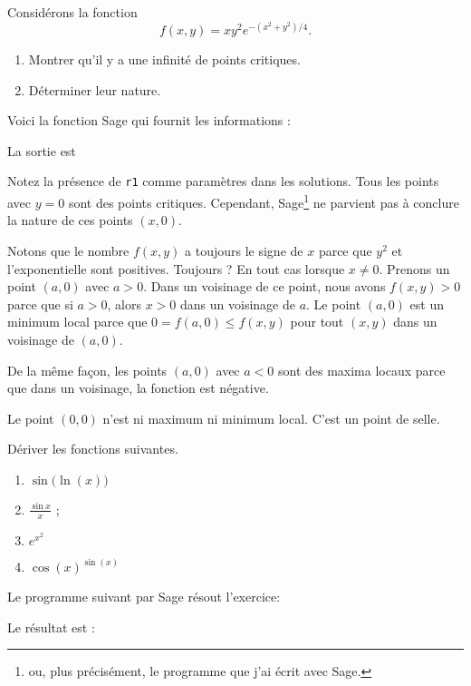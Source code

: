 \begin{example}     \label{exEEHPooKDxLTJ}
    

	Considérons la fonction
	\begin{equation}
		f(x,y)=xy^2 e^{-(x^2+y^2)/4}.
	\end{equation}
	\begin{enumerate}

		\item
			Montrer qu'il y a une infinité de points critiques.
		\item
			Déterminer leur nature.

	\end{enumerate}

	Voici la fonction Sage qui fournit les informations :

	

	La sortie est


	Notez la présence de \verb+r1+ comme paramètres dans les solutions. Tous les points avec $y=0$ sont des points critiques. Cependant, Sage\footnote{ou, plus précisément, le programme que j'ai écrit avec Sage.} ne parvient pas à conclure la nature de ces points $(x,0)$.

	Notons que le nombre $f(x,y)$ a toujours le signe de $x$ parce que $y^2$ et l'exponentielle sont positives. Toujours ? En tout cas lorsque $x\neq 0$. Prenons un point $(a,0)$ avec $a>0$. Dans un voisinage de ce point, nous avons $f(x,y)>0$ parce que si $a>0$, alors $x>0$ dans un voisinage de $a$. Le point $(a,0)$ est un minimum local parce que $0=f(a,0)\leq f(x,y)$ pour tout $(x,y)$ dans un voisinage de $(a,0)$.

	De la même façon, les points $(a,0)$ avec $a<0$ sont des maxima locaux parce que dans un voisinage, la fonction est négative. 

	Le point $(0,0)$ n'est ni maximum ni minimum local. C'est un point de selle.

\end{example}

\begin{example}     \label{exRNZKooUIOfPU}

    Dériver les fonctions suivantes.
	\begin{enumerate}
		\item 
			$\sin\big( \ln(x) \big)$
		\item
			$\displaystyle \frac{\sin x}{x}$ ;
		\item
			$ e^{x^2}$
		\item
			$\cos(x)^{\sin(x)}$
	\end{enumerate}

Le programme suivant par Sage résout l'exercice:


Le résultat est :

\end{example}

